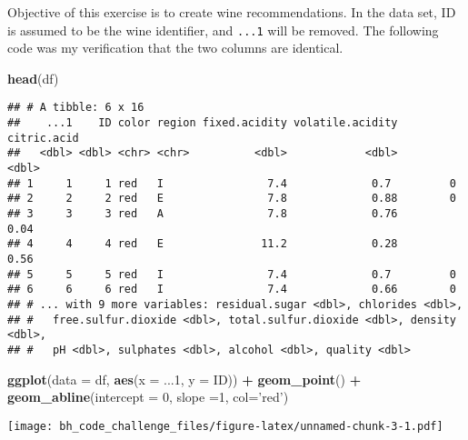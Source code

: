 \documentclass[
]{article}
\newenvironment{Shaded}{\begin{snugshade}}{\end{snugshade}}
\newcommand{\CommentTok}[1]{\textcolor[rgb]{0.56,0.35,0.01}{\textit{#1}}}
\newcommand{\DataTypeTok}[1]{\textcolor[rgb]{0.13,0.29,0.53}{#1}}
\newcommand{\DecValTok}[1]{\textcolor[rgb]{0.00,0.00,0.81}{#1}}
\newcommand{\KeywordTok}[1]{\textcolor[rgb]{0.13,0.29,0.53}{\textbf{#1}}}
\newcommand{\NormalTok}[1]{#1}
\newcommand{\OperatorTok}[1]{\textcolor[rgb]{0.81,0.36,0.00}{\textbf{#1}}}
\newcommand{\StringTok}[1]{\textcolor[rgb]{0.31,0.60,0.02}{#1}}
\begin{document}
Objective of this exercise is to create wine recommendations. In the
data set, ID is assumed to be the wine identifier, and \texttt{...1}
will be removed. The following code was my verification that the two
columns are identical.

\begin{Shaded}
\begin{Highlighting}[]
\KeywordTok{head}\NormalTok{(df)}
\end{Highlighting}
\end{Shaded}

\begin{verbatim}
## # A tibble: 6 x 16
##    ...1    ID color region fixed.acidity volatile.acidity citric.acid
##   <dbl> <dbl> <chr> <chr>          <dbl>            <dbl>       <dbl>
## 1     1     1 red   I                7.4             0.7         0   
## 2     2     2 red   E                7.8             0.88        0   
## 3     3     3 red   A                7.8             0.76        0.04
## 4     4     4 red   E               11.2             0.28        0.56
## 5     5     5 red   I                7.4             0.7         0   
## 6     6     6 red   I                7.4             0.66        0   
## # ... with 9 more variables: residual.sugar <dbl>, chlorides <dbl>,
## #   free.sulfur.dioxide <dbl>, total.sulfur.dioxide <dbl>, density <dbl>,
## #   pH <dbl>, sulphates <dbl>, alcohol <dbl>, quality <dbl>
\end{verbatim}

\begin{Shaded}
\begin{Highlighting}[]
\KeywordTok{ggplot}\NormalTok{(}\DataTypeTok{data =}\NormalTok{ df, }\KeywordTok{aes}\NormalTok{(}\DataTypeTok{x =}\NormalTok{ ...}\DecValTok{1}\NormalTok{, }\DataTypeTok{y =}\NormalTok{ ID)) }\OperatorTok{+}\StringTok{ }\KeywordTok{geom_point}\NormalTok{() }\OperatorTok{+}\StringTok{ }
\StringTok{  }\KeywordTok{geom_abline}\NormalTok{(}\DataTypeTok{intercept =} \DecValTok{0}\NormalTok{, }\DataTypeTok{slope =}\DecValTok{1}\NormalTok{, }\DataTypeTok{col=}\StringTok{'red'}\NormalTok{)}
\end{Highlighting}
\end{Shaded}

\texttt{[image: bh\_code\_challenge\_files/figure-latex/unnamed-chunk-3-1.pdf]}

\begin{Shaded}
\end{Shaded}
\end{document}
